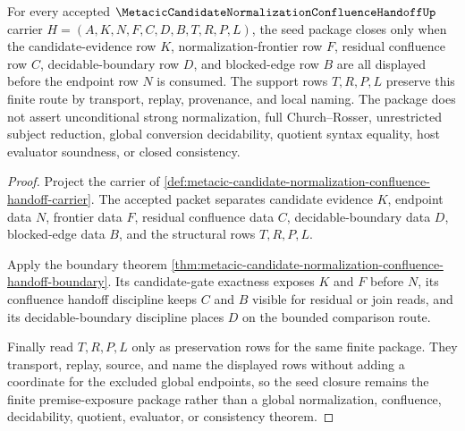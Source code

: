 \begin{theorem}
\label{thm:metacic-candidate-normalization-confluence-handoff-seed-closure}
For every accepted $\MetacicCandidateNormalizationConfluenceHandoffUp$ carrier $H=(A,K,N,F,C,D,B,T,R,P,L)$, the seed package closes only when the candidate-evidence row $K$, normalization-frontier row $F$, residual confluence row $C$, decidable-boundary row $D$, and blocked-edge row $B$ are all displayed before the endpoint row $N$ is consumed. The support rows $T,R,P,L$ preserve this finite route by transport, replay, provenance, and local naming. The package does not assert unconditional strong normalization, full Church--Rosser, unrestricted subject reduction, global conversion decidability, quotient syntax equality, host evaluator soundness, or closed consistency.
\end{theorem}
\begin{proof}
Project the carrier of \autoref{def:metacic-candidate-normalization-confluence-handoff-carrier}. The accepted packet separates candidate evidence $K$, endpoint data $N$, frontier data $F$, residual confluence data $C$, decidable-boundary data $D$, blocked-edge data $B$, and the structural rows $T,R,P,L$.

Apply the boundary theorem \autoref{thm:metacic-candidate-normalization-confluence-handoff-boundary}. Its candidate-gate exactness exposes $K$ and $F$ before $N$, its confluence handoff discipline keeps $C$ and $B$ visible for residual or join reads, and its decidable-boundary discipline places $D$ on the bounded comparison route.

Finally read $T,R,P,L$ only as preservation rows for the same finite package. They transport, replay, source, and name the displayed rows without adding a coordinate for the excluded global endpoints, so the seed closure remains the finite premise-exposure package rather than a global normalization, confluence, decidability, quotient, evaluator, or consistency theorem.
\end{proof}

